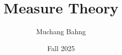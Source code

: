 \documentclass{article}
\begin{document}
\title{Measure Theory}
\author{Muchang Bahng}
\date{Fall 2025}

\maketitle
\tableofcontents
\pagebreak








\end{document}
